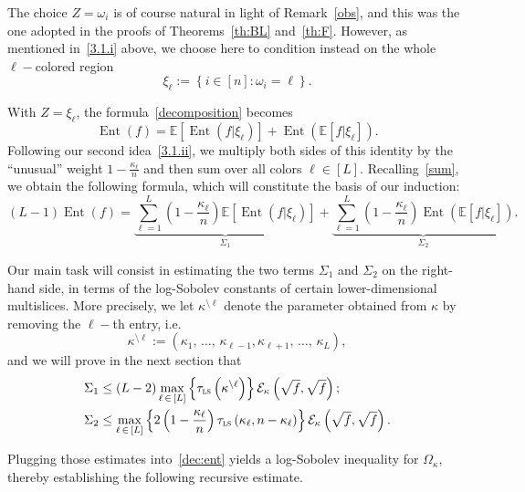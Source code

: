 \documentclass[10pt]{amsart}
\theoremstyle{definition}\newtheorem{defi}[theo]{Definition}\newtheorem{rema}[theo]{Remark}\newtheorem{exam}[theo]{Example}\newtheorem{exem}[theo]{Example}\newtheorem{nota}[theo]{Notation}
\newcommand{\EE}{\mathbb{E}}
\newcommand{\cE}{\mathcal{E}}
\newcommand{\tls}{\tau_{\textsc{ls}}}
\DeclareMathOperator{\ent}{Ent}
\begin{document}
The choice $Z=\omega_i$ is of course natural in light of Remark~\ref{obs}, and this was the one adopted in the proofs of Theorems~\ref{th:BL} and~\ref{th:F}. However, as mentioned in~\eqref{3.1.i} above, we choose here to condition instead on the whole $\ell-$colored region
\begin{equation}\label{def:xio}
\xi_\ell := \left\{i\in[n]\colon \omega_i=\ell\right\}.
\end{equation}

With $Z=\xi_\ell$, the formula~\eqref{decomposition} becomes
\begin{equation}\label{dec:set}
\ent(f) = \EE\left[\ent\left(f|\xi_\ell\right)\right]+\ent\left(\EE\left[f|\xi_\ell\right]\right).
\end{equation}
Following our second idea~\eqref{3.1.ii}, we multiply both sides of this identity by the ``unusual'' weight $1-\frac{\kappa_\ell}{n}$ and then sum over all colors $\ell\in[L]$. Recalling~\eqref{sum}, we obtain the following formula, which will constitute the basis of our induction:
\begin{equation}\label{dec:ent}
(L-1)\ent(f) = \underbrace{\sum_{\ell=1}^L\left(1-\frac{\kappa_\ell}{n}\right)\EE\left[\ent\left(f|\xi_\ell\right)\right]}_{\Sigma_1}+\underbrace{\sum_{\ell=1}^L\left(1-\frac{\kappa_\ell}{n}\right)\ent\left(\EE\left[f|\xi_\ell\right]\right)}_{\Sigma_2}.
\end{equation}

Our main task will consist in estimating the two terms $\Sigma_1$ and $\Sigma_2$ on the right-hand side, in terms of the log-Sobolev constants of certain lower-dimensional multislices. More precisely, we let $\kappa^{\setminus \ell}$ denote the parameter obtained from $\kappa$ by removing the $\ell-$th entry, i.e.
\[
\kappa^{\setminus\ell} := \left(\kappa_1,\,\ldots,\,\kappa_{\ell-1},\kappa_{\ell+1},\,\ldots,\,\kappa_L\right),
\]
and we will prove in the next section that
\begin{align}
\Sigma_1 & \le (L-2)\max_{\ell\,\in\,[L]}\left\{\tls\left(\kappa^{\setminus\ell}\right)\right\}\cE_\kappa\left(\sqrt{f},\sqrt{f}\right);\label{pr:first}\\
\Sigma_2 & \le \max_{\ell\,\in\,[L]}\left\{2\left(1-\frac{\kappa_\ell}n\right)\tls\left(\kappa_\ell,n-\kappa_\ell\right)\right\}\cE_\kappa\left(\sqrt{f},\sqrt{f}\right).\label{pr:second}
\end{align}

Plugging those estimates into~\eqref{dec:ent} yields a log-Sobolev inequality for $\Omega_\kappa$, thereby establishing the following recursive estimate.
\end{document}
